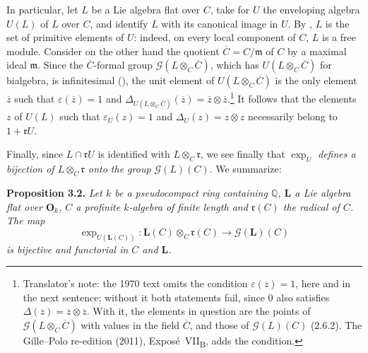 In particular, let \(L\) be a Lie algebra flat over \(C\), take for
\(U\) the enveloping algebra \(U(L)\) of \(L\) over \(C\), and
identify \(L\) with its canonical image in \(U\). By ,
\(L\) is the set of primitive elements of \(U\): indeed, on every
local component of \(C\), \(L\) is a free module. Consider on the other hand the quotient \(\overline C=C/\mathfrak m\) of
\(C\) by a maximal ideal \(\mathfrak m\). Since the \(\overline C\)-formal group
\(\mathscr G(L\otimes_C\overline C)\), which has \(U(L\otimes_C\overline C)\) for
bialgebra, is infinitesimal \textup{()}, the unit element of
\(U(L\otimes_C\overline C)\) is the only element \(\overline z\) such that
\(\varepsilon(\overline z)=1\) and
\(\Delta_{U(L\otimes_C\overline C)}(\overline z)=\overline z\otimes\overline z\).\footnote{Translator's note: the
1970 text omits the condition \(\varepsilon(\overline z)=1\), here and in the next sentence; without it both
statements fail, since \(0\) also satisfies \(\Delta(\overline z)=\overline z\otimes\overline z\). With it, the
elements in question are the points of \(\mathscr G(L\otimes_C\overline C)\) with values in the field
\(\overline C\), and those of \(\mathscr G(L)(C)\) (2.6.2). The Gille--Polo re-edition (2011),
Expos\'e~VII\textsubscript{B}, adds the condition.} It follows
that the elements \(z\) of \(U(L)\) such that \(\varepsilon_U(z)=1\) and
\(\Delta_U(z)=z\otimes z\) necessarily belong to \(1+\mathfrak rU\).

Finally, since \(L\cap\mathfrak rU\) is identified with
\(L\otimes_C\mathfrak r\), we see finally that \emph{\(\exp_U\) defines a
bijection of \(L\otimes_C\mathfrak r\) onto the group
\(\mathscr G(L)(C)\)}. We summarize:

\medskip
\noindent\textbf{Proposition 3.2.}
\label{sga3:VIIB:3.2:prop}
{\itshape Let \(k\) be a pseudocompact ring containing \(\mathbb Q\),
\(\mathbf L\) a Lie algebra flat over \(\mathbf O_k\), \(C\) a profinite
\(k\)-algebra of finite length and \(\mathfrak r(C)\) the radical of \(C\).
The map
\[
  \exp_{U(\mathbf L(C))}:
  \mathbf L(C)\otimes_C\mathfrak r(C)
  \longrightarrow
  \mathscr G(\mathbf L)(C)
\]
is bijective and functorial in \(C\) and \(\mathbf L\).}

